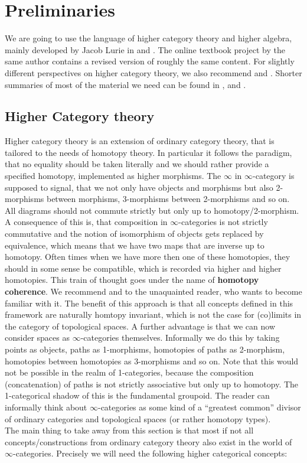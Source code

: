 \chapter{Preliminaries}\label{Prelims}
We are going to use the language of higher category theory and higher algebra, mainly developed by Jacob Lurie in \cite{HigherToposTheory} and \cite{lurie2017higher}. 
The online textbook project \cite{kerodon} by the same author contains a revised version of roughly the same content. For slightly different perspectives on higher category theory, we also recommend \cite{RiehlVerityElements} and \cite{cisinski2019higher}.
Shorter summaries of most of the material we need can be found in \cite{Grothshortcourse}, \cite{camarena2013whirlwind} and \cite{Gepnerintroductionhigher}.
\section{Higher Category theory}\label{highercats}
Higher category theory is an extension of ordinary category theory, that is tailored to the needs of homotopy theory. In particular it follows the paradigm, that no equality should be taken literally and we should rather provide a specified homotopy, implemented as higher morphisms. 
The $\infty$ in $\infty$-category is supposed to signal, that we not only have objects and morphisms but also 2-morphisms between morphisms, 3-morphisms between 2-morphisms and so on. All diagrams should not commute strictly but only up to homotopy/2-morphism. 
A consequence of this is, that composition in $\infty$-categories is not strictly commutative and the notion of isomorphism of objects gets replaced by equivalence, which means that we have two maps that are inverse up to homotopy.
Often times when we have more then one of these homotopies, they should in some sense be compatible, which is recorded via higher and higher homotopies. This train of thought goes under the name of  \textbf{homotopy coherence}.
We recommend \cite{riehl2018homotopy} and \cite[Section~1.2.6]{HigherToposTheory} to the unaquainted reader, who wants  to become familiar with it. The benefit of this approach is that all concepts defined in this framework are naturally homtopy invariant, which is not the case for (co)limits in the category of topological spaces. 
A further advantage is that we can now consider spaces as $\infty$-categories themselves. Informally we do this by taking points as objects, paths as 1-morphisms, homotopies of paths as 2-morphism, homotopies between homotopies as 3-morphisms and so on. Note that this would not be possible in the realm of 1-categories, because the composition (concatenation) of paths is not strictly associative but only up to homotopy. The 1-categorical shadow of this is the fundamental groupoid. The reader can informally think about $\infty$-categories as some kind of a ``greatest common'' divisor of ordinary categories and topological spaces (or rather homotopy types).\\
The main thing to take away from this section is that most if not all concepts/constructions from ordinary category theory also exist in the world of $\infty$-categories.
Precisely we will need the following higher categorical concepts:


